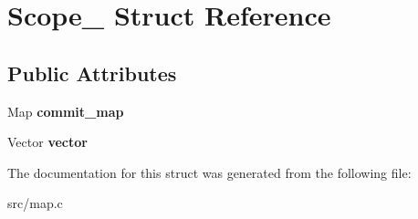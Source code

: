 \hypertarget{structScope__}{}\section{Scope\+\_\+ Struct Reference}
\label{structScope__}
\subsection*{Public Attributes}
\begin{DoxyCompactItemize}
\item 
\hypertarget{structScope___a6cc67d83db1cc46212f8135436ff2ba4}{}\label{structScope___a6cc67d83db1cc46212f8135436ff2ba4} 
Map {\bfseries commit\+\_\+map}
\item 
\hypertarget{structScope___ad55c55c18b75c96d961de2c9e072fe84}{}\label{structScope___ad55c55c18b75c96d961de2c9e072fe84} 
Vector {\bfseries vector}
\end{DoxyCompactItemize}


The documentation for this struct was generated from the following file\+:\begin{DoxyCompactItemize}
\item 
src/map.\+c\end{DoxyCompactItemize}

